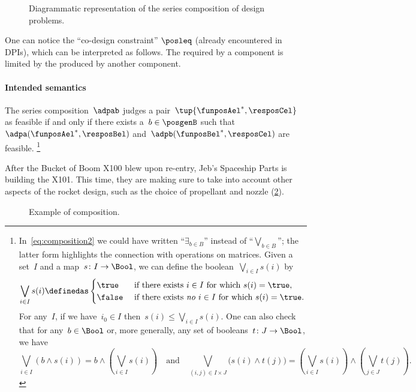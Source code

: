 \begin{figure}[h!]
    \centering
    \caption{Diagrammatic representation of the series composition of design problems. }
    \label{fig:compositiondiagram}
\end{figure}

One can notice the ``co-design constraint'' $\posleq$ (already encountered in DPIs), which can be interpreted as follows.
The  required by a component is limited by the  produced by another component.


\paragraph{Intended semantics}
The series composition~$\adpab$ judges a pair~$\tup{\funposAel^*,\resposCel}$ as feasible if and only if there exists a~$b \in \posgenB$ such that~$\adpa(\funposAel^*,\resposBel)$ and~$\adpb(\funposBel^*,\resposCel)$ are feasible.
\footnote{In~\cref{eq:composition2} we could have written ``$\exists_{b\in B}$'' instead of ``$\bigvee_{b\in B}$''; the latter form highlights the connection with operations on matrices.
Given a set~$I$ and a map~$s\colon I\to\Bool$, we can define the boolean~$\bigvee_{i\in I}s(i)$ by
    \begin{equation*}
        \bigvee_{i\in I}s(i)\definedas
        \begin{cases}
            \true&\text{ if there exists }i\in I\text{ for which }s(i)=\true,\\
            \false&\text{ if there exists \emph{no} }i\in I\text{ for which }s(i)=\true.
        \end{cases}
    \end{equation*}
    For any~$I$, if we have~$i_0\in I$ then~$s(i)\leq\bigvee_{i\in I}s(i)$. One can also check that for any~$b\in\Bool$ or, more generally, any set of booleans~$t\colon J\to\Bool$, we have
    \begin{equation*}
        \bigvee_{i\in I}(b\wedge s(i))=b\wedge\left(\bigvee_{i\in I}s(i)\right)
        \quad\text{and}\quad
        \bigvee_{(i,j)\in I\times  J}\big(s(i)\wedge t(j)\big)=\left(\bigvee_{i\in I}s(i)\right)\wedge\left(\bigvee_{j\in J} t(j)\right).
    \end{equation*}
}

\begin{example}
    After the Bucket of Boom X100 blew upon re-entry, Jeb's Spaceship Parts is building the X101. This time, they are making sure to take into account other aspects of the rocket design, such as the choice of propellant and nozzle (\cref{fig:examplecomposition}).
    \begin{figure}[h!]
        \centering
        \caption{Example of composition. }
        \label{fig:examplecomposition}
    \end{figure}
\end{example}

